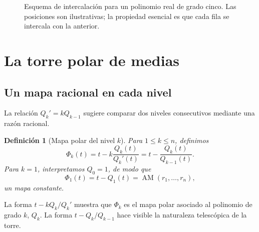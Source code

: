\documentclass[11pt,oneside]{scrartcl}
\theoremstyle{plainblue}
\theoremstyle{definitionblue}
\newtheorem{definition}[theorem]{Definición}
\theoremstyle{remarkgray}
\newcommand{\AM}{\operatorname{AM}}
\begin{document}
\begin{figure}[ht]
\centering
{}
\caption{Esquema de intercalación para un polinomio real de grado cinco. Las posiciones son ilustrativas; la propiedad esencial es que cada fila se intercala con la anterior.}
\label{fig:interlacing}
\end{figure}

\section{La torre polar de medias}

\subsection{Un mapa racional en cada nivel}

La relación \(Q_k'=kQ_{k-1}\) sugiere comparar dos niveles consecutivos mediante una
razón racional.

\begin{definition}[Mapa polar del nivel \(k\)]\label{def:Phik}
Para \(1\le k\le n\), definimos
\begin{equation}\label{eq:Phik}
\Phi_k(t)
=t-k\frac{Q_k(t)}{Q_k'(t)}
=t-\frac{Q_k(t)}{Q_{k-1}(t)}.
\end{equation}
Para \(k=1\), interpretamos \(Q_0=1\), de modo que
\[
\Phi_1(t)=t-Q_1(t)=\AM(r_1,\dots,r_n),
\]
un mapa constante.
\end{definition}

La forma \(t-kQ_k/Q_k'\) muestra que \(\Phi_k\) es el mapa polar asociado al
polinomio de grado \(k\), \(Q_k\). La forma \(t-Q_k/Q_{k-1}\) hace visible la
naturaleza telescópica de la torre.
\end{document}
